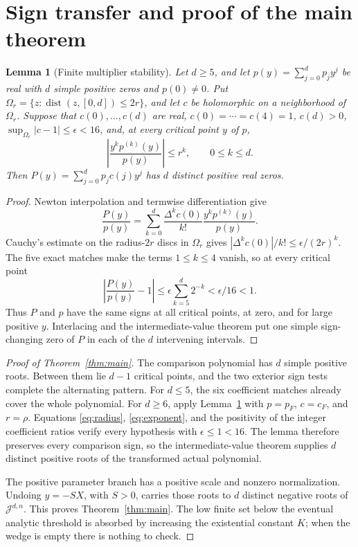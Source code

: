 \documentclass[11pt]{article}
\newtheorem{lemma}[theorem]{Lemma}
\theoremstyle{definition}
\theoremstyle{remark}
\newcommand{\J}{\mathcal J}
\begin{document}
\section{Sign transfer and proof of the main theorem}\label{sec:assembly}

\begin{lemma}[Finite multiplier stability]\label{lem:stability}
Let $d\ge5$, and let $p(y)=\sum_{j=0}^dp_jy^j$ be real with $d$ simple
positive zeros and $p(0)\ne0$.  Put
$\Omega_r=\{z:\operatorname{dist}(z,[0,d])\le2r\}$, and let $c$ be
holomorphic on a neighborhood of $\Omega_r$.  Suppose that
$c(0),\ldots,c(d)$ are real,
$c(0)=\cdots=c(4)=1$, $c(d)>0$,
$\sup_{\Omega_r}|c-1|\le\epsilon<16$, and, at every critical point $y$ of
$p$,
\[
 \left|\frac{y^kp^{(k)}(y)}{p(y)}\right|\le r^k,
 \qquad0\le k\le d.
\]
Then $P(y)=\sum_{j=0}^dp_jc(j)y^j$ has $d$ distinct positive real zeros.
\end{lemma}

\begin{proof}
Newton interpolation and termwise differentiation give
\[
 \frac{P(y)}{p(y)}
 =\sum_{k=0}^d\frac{\Delta^kc(0)}{k!}
   \frac{y^kp^{(k)}(y)}{p(y)}.
\]
Cauchy's estimate on the radius-$2r$ discs in $\Omega_r$ gives
$|\Delta^kc(0)|/k!\le\epsilon/(2r)^k$.  The five exact matches make the
terms $1\le k\le4$ vanish, so at every critical point
\[
 \left|\frac{P(y)}{p(y)}-1\right|
 \le\epsilon\sum_{k=5}^d2^{-k}<\epsilon/16<1.
\]
Thus $P$ and $p$ have the same signs at all critical points, at zero, and
for large positive $y$.  Interlacing and the intermediate-value theorem put
one simple sign-changing zero of $P$ in each of the $d$ intervening
intervals.
\end{proof}

\begin{proof}[Proof of Theorem~\ref{thm:main}]
The comparison polynomial has $d$ simple positive roots.  Between them lie
$d-1$ critical points, and the two exterior sign tests complete the
alternating pattern.  For $d\le5$, the six coefficient matches already cover
the whole polynomial.  For $d\ge6$, apply Lemma~\ref{lem:stability} with
$p=p_F$, $c=c_F$, and $r=\rho$.  Equations \eqref{eq:radius},
\eqref{eq:exponent}, and the positivity of the integer coefficient ratios
verify every hypothesis with $\epsilon\le1<16$.  The lemma therefore
preserves every comparison sign, so the
intermediate-value theorem supplies $d$ distinct positive roots of the
transformed actual polynomial.

The positive parameter branch has a positive scale and nonzero
normalization.  Undoing $y=-SX$, with $S>0$, carries those roots to $d$
distinct negative roots of $\J^{d,n}$.  This proves
Theorem~\ref{thm:main}.  The low finite set below the eventual analytic
threshold is absorbed by increasing the existential constant $K$; when the
wedge is empty there is nothing to check.
\end{proof}
\end{document}
